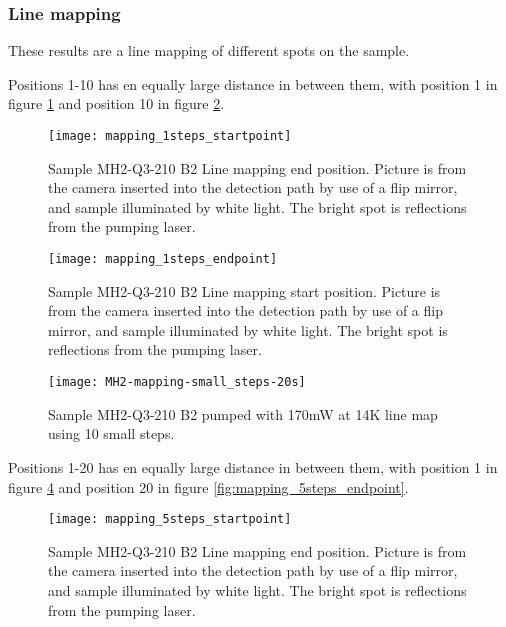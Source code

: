 \subsubsection{Line mapping}

These results are a line mapping of different spots on the sample.

Positions 1-10 has en equally large distance in between them, with position 1 in figure \ref{fig:mapping_1steps_startpoint} and position 10 in figure \ref{fig:mapping_1steps_endpoint}.

\begin{figure}[H]
\centering
\texttt{[image: mapping\_1steps\_startpoint]}
\caption[MH2-Q3-210 line mapping start position]{Sample MH2-Q3-210 B2 Line mapping end position. Picture is from the camera inserted into the detection path by use of a flip mirror, and sample illuminated by white light. The bright spot is reflections from the pumping laser.}
\label{fig:mapping_1steps_startpoint}%
\end{figure}


\begin{figure}[H]
\centering
\texttt{[image: mapping\_1steps\_endpoint]}
\caption[MH2-Q3-210 line mapping start position]{Sample MH2-Q3-210 B2 Line mapping start position. Picture is from the camera inserted into the detection path by use of a flip mirror, and sample illuminated by white light. The bright spot is reflections from the pumping laser.}
\label{fig:mapping_1steps_endpoint}%
\end{figure}

\begin{figure}[H]
\centering
\texttt{[image: MH2-mapping-small\_steps-20s]}
\caption[MH2-Q3-210 line mapping]{Sample MH2-Q3-210 B2 pumped with 170mW at 14K line map using 10 small steps.}
\label{fig:MH2-mapping-small_steps-20s}%
\end{figure}






Positions 1-20 has en equally large distance in between them, with position 1 in figure \ref{fig:mapping_5steps_startpoint} and position 20 in figure \ref{fig:mapping_5steps_endpoint}.

\begin{figure}[H]
\centering
\texttt{[image: mapping\_5steps\_startpoint]}
\caption[MH2-Q3-210 line mapping start position]{Sample MH2-Q3-210 B2 Line mapping end position. Picture is from the camera inserted into the detection path by use of a flip mirror, and sample illuminated by white light. The bright spot is reflections from the pumping laser.}
\label{fig:mapping_5steps_startpoint}%
\end{figure}


